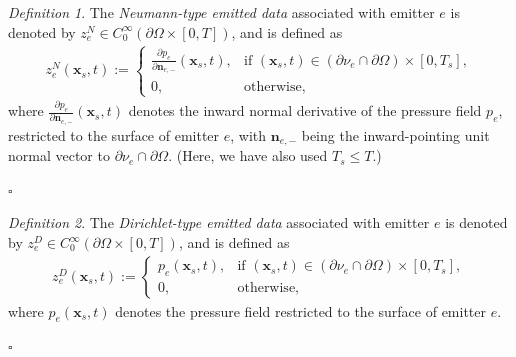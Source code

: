 \documentclass[11pt,reqno]{amsart}
\theoremstyle{remark}
\newtheorem{definition}{Definition}
\theoremstyle{italic_lemma}
\newcommand{\bx}{\boldsymbol{x}}
\newcommand{\bn}{\boldsymbol{n}}
\begin{document}
\begin{definition}
The \emph{Neumann-type emitted data} associated with emitter \(e\) is denoted by 
\(z_e^N \in C_0^\infty(\partial \Omega \times [0,T])\), and is defined as
\begin{align}  \label{eq:neumann-source1}
z_e^N(\bx_s, t) := 
\begin{cases}
\displaystyle \frac{\partial p_e}{\partial \bn_{e,-}}(\bx_s, t), 
& \text{if } (\bx_s, t) \in (\partial \nu_e \cap \partial \Omega) \times [0, T_s], \\[1ex]
0, & \text{otherwise},
\end{cases}
\end{align}
where \(\tfrac{\partial p_e}{\partial \bn_{e,-}}(\bx_s, t)\) denotes the inward 
normal derivative of the pressure field \(p_e\), restricted to the surface of 
emitter \(e\), with \(\bn_{e,-}\) being the inward-pointing unit normal vector 
to \(\partial \nu_e \cap \partial \Omega\). (Here, we have also used \(T_s \leq T\).)
\end{definition}
\hfill \(\square\)


\begin{definition}
The \emph{Dirichlet-type emitted data} associated with emitter \( e \) is denoted by 
\( z_e^D \in C_0^\infty(\partial \Omega \times [0,T]) \), and is defined as
\begin{align} \label{eq:Dirichlet-source1}
z_e^D(\bx_s, t) := 
\begin{cases}
p_e(\bx_s, t), 
& \text{if } (\bx_s, t) \in (\partial \nu_e \cap \partial \Omega) \times [0, T_s], \\[1ex]
0, & \text{otherwise},
\end{cases}
\end{align}
where \( p_e(\bx_s, t) \) denotes the pressure field restricted to the surface of emitter \( e \).
\end{definition}
\hfill \(\square\)
\end{document}
